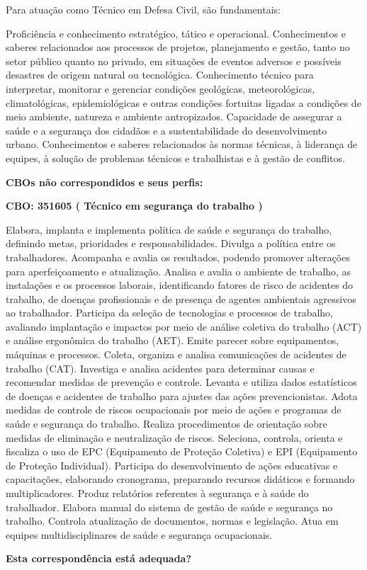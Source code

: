 \documentclass[
]{article}
\begin{document}
Para atuação como Técnico em Defesa Civil, são fundamentais:

Proficiência e conhecimento estratégico, tático e operacional.
Conhecimentos e saberes relacionados aos processos de projetos,
planejamento e gestão, tanto no setor público quanto no privado, em
situações de eventos adversos e possíveis desastres de origem natural ou
tecnológica. Conhecimento técnico para interpretar, monitorar e
gerenciar condições geológicas, meteorológicas, climatológicas,
epidemiológicas e outras condições fortuitas ligadas a condições de meio
ambiente, natureza e ambiente antropizados. Capacidade de assegurar a
saúde e a segurança dos cidadãos e a sustentabilidade do desenvolvimento
urbano. Conhecimentos e saberes relacionados às normas técnicas, à
liderança de equipes, à solução de problemas técnicos e trabalhistas e à
gestão de conflitos.

\textbf{CBOs não correspondidos e seus perfis:}

\textbf{CBO: 351605  ( Técnico em segurança do trabalho )}

Elabora, implanta e implementa política de saúde e segurança do
trabalho, definindo metas, prioridades e responsabilidades. Divulga a
política entre os trabalhadores. Acompanha e avalia os resultados,
podendo promover alterações para aperfeiçoamento e atualização. Analisa
e avalia o ambiente de trabalho, as instalações e os processos laborais,
identificando fatores de risco de acidentes do trabalho, de doenças
profissionais e de presença de agentes ambientais agressivos ao
trabalhador. Participa da seleção de tecnologias e processos de
trabalho, avaliando implantação e impactos por meio de análise coletiva
do trabalho (ACT) e análise ergonômica do trabalho (AET). Emite parecer
sobre equipamentos, máquinas e processos. Coleta, organiza e analisa
comunicações de acidentes de trabalho (CAT). Investiga e analisa
acidentes para determinar causas e recomendar medidas de prevenção e
controle. Levanta e utiliza dados estatísticos de doenças e acidentes de
trabalho para ajustes das ações prevencionistas. Adota medidas de
controle de riscos ocupacionais por meio de ações e programas de saúde e
segurança do trabalho. Realiza procedimentos de orientação sobre medidas
de eliminação e neutralização de riscos. Seleciona, controla, orienta e
fiscaliza o uso de EPC (Equipamento de Proteção Coletiva) e EPI
(Equipamento de Proteção Individual). Participa do desenvolvimento de
ações educativas e capacitações, elaborando cronograma, preparando
recursos didáticos e formando multiplicadores. Produz relatórios
referentes à segurança e à saúde do trabalhador. Elabora manual do
sistema de gestão de saúde e segurança no trabalho. Controla atualização
de documentos, normas e legislação. Atua em equipes multidisciplinares
de saúde e segurança ocupacionais.

\begin{Form}
\textbf{Esta correspondência está adequada?} \\ 
\end{Form}
\end{document}
